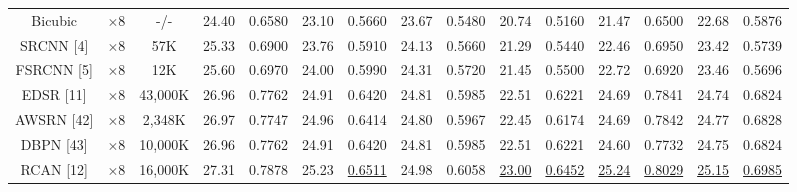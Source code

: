 \documentclass[journal]{IEEEtran}
\begin{document}
\begin{table}
\begin{tabular}{|c|c|c|cc|cc|cc|cc|cc|cc|}
Bicubic&$\times8$ &-/-& \multicolumn{1}{c|}{24.40} &0.6580& \multicolumn{1}{c|}{23.10} &0.5660 & \multicolumn{1}{c|}{23.67} &0.5480& \multicolumn{1}{c|}{20.74} &0.5160 & \multicolumn{1}{c|}{21.47} & 0.6500
&\multicolumn{1}{c|}{22.68} & 0.5876     \\

SRCNN [4] & $\times8$ &57K& \multicolumn{1}{c|}{25.33} & 0.6900 & \multicolumn{1}{c|}{23.76} &0.5910 &\multicolumn{1}{c|}{24.13} &0.5660 & \multicolumn{1}{c|}{21.29} &0.5440& \multicolumn{1}{c|}{22.46} &0.6950
&\multicolumn{1}{c|}{23.42} & 0.5739      \\

FSRCNN [5]& $\times8$&12K& \multicolumn{1}{c|}{25.60} &0.6970 & \multicolumn{1}{c|}{24.00} &0.5990&\multicolumn{1}{c|}{24.31} &0.5720 & \multicolumn{1}{c|}{21.45} &0.5500 & \multicolumn{1}{c|}{22.72} & 0.6920
&\multicolumn{1}{c|}{23.46} &  0.5696      \\


EDSR [11]& $\times8$&43,000K& \multicolumn{1}{c|}{26.96} &  0.7762 & \multicolumn{1}{c|}{24.91} & 0.6420&\multicolumn{1}{c|}{24.81} & 0.5985 & \multicolumn{1}{c|}{22.51  } &0.6221 & \multicolumn{1}{c|}{24.69 } &0.7841
&\multicolumn{1}{c|}{24.74  } &  0.6824       \\

AWSRN [42]& $\times8$&2,348K& \multicolumn{1}{c|}{26.97} &  0.7747 & \multicolumn{1}{c|}{24.96} & 0.6414&\multicolumn{1}{c|}{24.80} & 0.5967 & \multicolumn{1}{c|}{22.45  } &0.6174 & \multicolumn{1}{c|}{24.69 } &0.7842 &\multicolumn{1}{c|}{24.77  } &  0.6828       \\

DBPN [43]& $\times8$&10,000K& \multicolumn{1}{c|}{26.96} &  0.7762 & \multicolumn{1}{c|}{24.91} & 0.6420&\multicolumn{1}{c|}{24.81} & 0.5985 & \multicolumn{1}{c|}{22.51  } &0.6221 & \multicolumn{1}{c|}{24.60 } &0.7732
&\multicolumn{1}{c|}{24.75  } &  0.6824       \\

RCAN [12]& $\times8$&16,000K& \multicolumn{1}{c|}{27.31} &  0.7878 & \multicolumn{1}{c|}{25.23} & {\color{blue}\underline{0.6511}}&\multicolumn{1}{c|}{24.98} & 0.6058 & \multicolumn{1}{c|}{\color{blue}\underline{23.00}} &{\color{blue}\underline{0.6452}} & \multicolumn{1}{c|}{\color{blue}\underline{25.24 }} &{\color{blue}\underline{0.8029}}
&\multicolumn{1}{c|}{\color{blue}\underline{25.15}} &  {\color{blue}\underline{0.6985}}       \\


\end{tabular}
\end{table}
\end{document}
